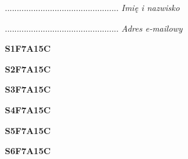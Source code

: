 \begin{turn}{90}\begin{minipage}{\linewidth} \vspace{20mm} ................................................  \textit{Imię i nazwisko}\end{minipage}\end{turn}

\begin{turn}{90}\begin{minipage}{\linewidth} \vspace{20mm} ................................................  \textit{Adres e-mailowy}\end{minipage}\end{turn}

\begin{turn}{90}\huge \begin{minipage}{\linewidth} \vspace{10mm}\textbf{S1F7A15C}\end{minipage}\end{turn}

\begin{turn}{90}\huge \begin{minipage}{\linewidth} \vspace{10mm}\textbf{S2F7A15C}\end{minipage}\end{turn}

\begin{turn}{90}\huge \begin{minipage}{\linewidth} \vspace{10mm}\textbf{S3F7A15C}\end{minipage}\end{turn}

\begin{turn}{90}\huge \begin{minipage}{\linewidth} \vspace{10mm}\textbf{S4F7A15C}\end{minipage}\end{turn}

\begin{turn}{90}\huge \begin{minipage}{\linewidth} \vspace{10mm}\textbf{S5F7A15C}\end{minipage}\end{turn}

\begin{turn}{90}\huge \begin{minipage}{\linewidth} \vspace{10mm}\textbf{S6F7A15C}\end{minipage}\end{turn}

